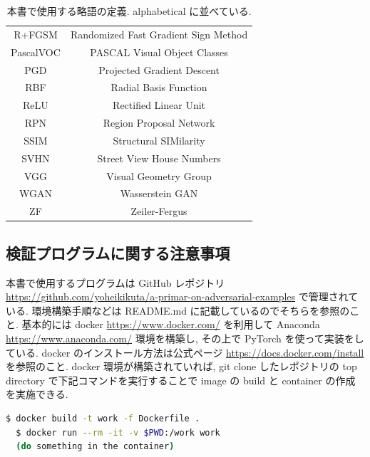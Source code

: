 \begin{table}[htbp]
\begin{center}
\begin{tabular}{c|c}
R+FGSM & Randomized Fast Gradient Sign Method \\
PascalVOC & PASCAL Visual Object Classes \\
PGD & Projected Gradient Descent \\
RBF & Radial Basis Function \\
ReLU & Rectified Linear Unit \\
RPN & Region Proposal Network \\
SSIM & Structural SIMilarity \\
SVHN & Street View House Numbers \\
VGG & Visual Geometry Group \\
WGAN & Wasserstein GAN \\
ZF & Zeiler-Fergus\\
\hline
\end{tabular}
\caption{
本書で使用する略語の定義.
alphabetical に並べている.
\label{tb:abbreviation}
}
\end{center}
\end{table}
%



\subsection{検証プログラムに関する注意事項}
\label{subsec:note_on_code}
本書で使用するプログラムは GitHub レポジトリ \href{https://github.com/yoheikikuta/a-primar-on-adversarial-examples}{https://github.com/yoheikikuta/a-primar-on-adversarial-examples} で管理されている.
環境構築手順などは README.md に記載しているのでそちらを参照のこと.
基本的には docker \href{https://www.docker.com/}{https://www.docker.com/} を利用して Anaconda \href{https://www.anaconda.com/}{https://www.anaconda.com/} 環境を構築し, その上で PyTorch \cite{paszke2019pytorch} を使って実装をしている.
docker のインストール方法は公式ページ \href{https://docs.docker.com/install}{https://docs.docker.com/install} を参照のこと.
docker 環境が構築されていれば, git clone したレポジトリの top directory で下記コマンドを実行することで image の build と container の作成を実施できる.
%
\begin{lstlisting}[language=bash]
  $ docker build -t work -f Dockerfile .
  $ docker run --rm -it -v $PWD:/work work
  (do something in the container)
\end{lstlisting}
%

